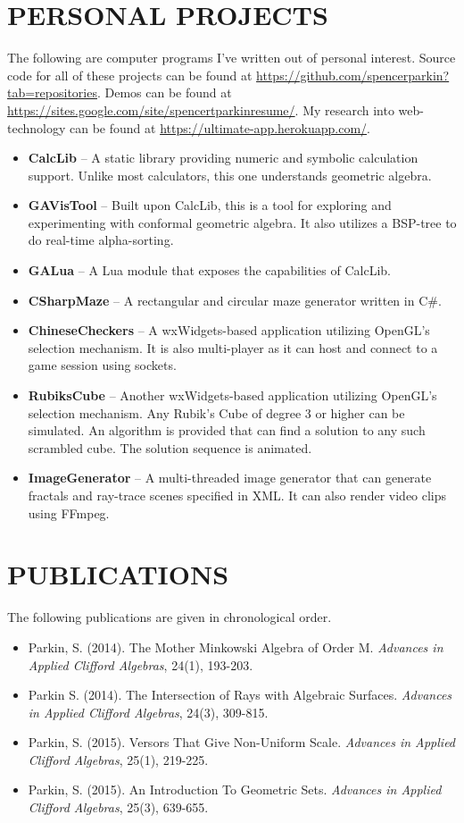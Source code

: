 \documentclass[margin]{res}
\begin{document}
\begin{resume}
\section{PERSONAL PROJECTS}
		The following are computer programs I've written out of personal interest.  Source code for all of these projects can be found at \url{https://github.com/spencerparkin?tab=repositories}.  Demos can be found at \url{https://sites.google.com/site/spencertparkinresume/}.  My research into web-technology can be found at \url{https://ultimate-app.herokuapp.com/}.
		\begin{itemize}\itemsep -2pt %
		\item \textbf{CalcLib} -- A static library providing numeric and symbolic calculation support.  Unlike most calculators, this one understands geometric algebra.
		\item \textbf{GAVisTool} -- Built upon CalcLib, this is a tool for exploring and experimenting with conformal geometric algebra.  It also utilizes a BSP-tree to do real-time alpha-sorting.
		\item \textbf{GALua} -- A Lua module that exposes the capabilities of CalcLib.
		\item \textbf{CSharpMaze} -- A rectangular and circular maze generator written in C\#.
		\item \textbf{ChineseCheckers} -- A wxWidgets-based application utilizing OpenGL's selection mechanism.  It is also multi-player as it can host and connect to a game session using sockets.
		\item \textbf{RubiksCube} -- Another wxWidgets-based application utilizing OpenGL's selection mechanism.  Any Rubik's Cube of degree 3 or higher can be simulated.  An algorithm is provided that can find a solution to any such scrambled cube.  The solution sequence is animated.
		\item \textbf{ImageGenerator} -- A multi-threaded image generator that can generate fractals and ray-trace scenes specified in XML.  It can also render video clips using FFmpeg.
		\end{itemize}

\section{PUBLICATIONS}
		The following publications are given in chronological order.
		\begin{itemize}\itemsep -2pt %
		\item Parkin, S. (2014).  The Mother Minkowski Algebra of Order M.  {\it Advances in Applied Clifford Algebras}, 24(1), 193-203.
		\item Parkin S.  (2014).  The Intersection of Rays with Algebraic Surfaces.  {\it Advances in Applied Clifford Algebras}, 24(3), 309-815.
		\item Parkin, S.  (2015).  Versors That Give Non-Uniform Scale.  {\it Advances in Applied Clifford Algebras}, 25(1), 219-225.
		\item Parkin, S.  (2015).  An Introduction To Geometric Sets.  {\it Advances in Applied Clifford Algebras}, 25(3), 639-655.
		\end{itemize}


\end{resume}
\end{document}

